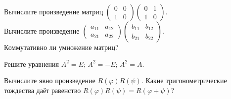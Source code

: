\documentclass[a4paper,12pt]{article}
\begin{document}
  Вычислите произведение матриц $\begin{pmatrix} 0 & 0 \\ 1 & 0 \end{pmatrix} \begin{pmatrix} 0 & 1 \\ 1 & 0 \end{pmatrix}$.\\
 Вычислите произведение $ \begin{pmatrix}
a_{11} & a_{12} \\ a_{21} & a_{22} \end{pmatrix} \begin{pmatrix} b_{11} & b_{12} \\ b_{21} & b_{22} \end{pmatrix}$.\\
 Коммутативно ли умножение матриц?

 Решите уравнения  $A^2 = E$;  $A^2 = -E$;  $A^2=A$.

 Вычислите явно произведение $R(\varphi)R(\psi)$. Какие тригонометрические тождества даёт равенство $R(\varphi)R(\psi)= R(\varphi+\psi)$?


\end{document}
